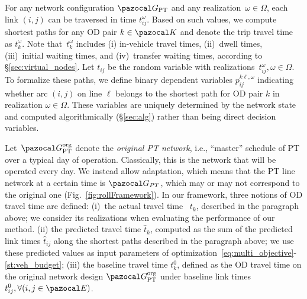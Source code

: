 \documentclass[a4paper,fleqn]{cas-sc}
\begin{document}
For any network configuration $\pazocal G_\text{PT}$ and any realization~$\omega\in\Omega$, each link $(i,j)$ can be traversed in time $t_{ij}^\omega$. Based on such values, we compute shortest paths for any OD pair $k\in\pazocal K$ and denote the trip travel time as $t_k^\omega$. Note that~$t_k^\omega$ includes (i) in-vehicle travel times, (ii)~dwell times, (iii)~initial waiting times, and (iv)~transfer waiting times, according to \S{}\ref{sec:virtual_nodes}. Let $t_{ij}$ be the random variable with realizations~$t_{ij}^\omega,\omega\in\Omega$. 
%
%
To formalize these paths, we define binary dependent variables $p_{ij}^{k\ell,\omega}$ indicating whether arc $(i,j)$ on line $\ell$ belongs to the shortest path for OD pair $k$ in realization $\omega\in\Omega$. These variables are uniquely determined by the network state and computed algorithmically (\S\ref{sec:alg}) rather than being direct decision variables.

Let~$\pazocal G_\text{PT}^\text{org}$ denote the \emph{original PT network}, i.e., ``master'' schedule of PT over a typical day of operation. Classically, this is the network that will be operated every day. We instead allow adaptation, which means that the PT line network at a certain time is $\pazocal G_{PT}$, which may or may not correspond to the original one (Fig.~\ref{fig:rollFramework}).
%
In our framework, three notions of OD travel time are defined:
(i)~the actual travel time ~$t_k$, described in the paragraph above; we consider its realizations when evaluating the performance of our method.
(ii) the predicted travel time $\hat t_k$, computed as the sum of the predicted link times $\hat t_{ij}$ along the shortest paths described in the paragraph above; we use these predicted values as input parameters of optimization~\eqref{eq:multi_objective}-\eqref{st:veh_budget};
(iii) the baseline travel time $t_k^0$, defined as the OD travel time on the original network design $\pazocal G_\text{PT}^\text{org}$ under baseline link times $t_{ij}^0,\forall (i,j\in\pazocal E)$.
\end{document}
